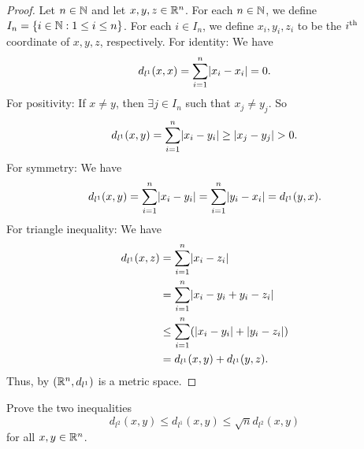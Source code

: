 \begin{proof}
  Let \(n \in \mathbb{N}\) and let \(x, y, z \in \mathbb{R}^n\).
  For each \(n \in \mathbb{N}\), we define \(I_n = \left\lbrace i \in \mathbb{N} : 1 \leq i \leq n\right\rbrace\).
  For each \(i \in I_n\), we define \(x_i, y_i, z_i\) to be the \(i^{\operatorname{th}}\) coordinate of \(x, y, z\), respectively.
  For identity:
  We have
  \[
    d_{l^1}(x, x) = \sum_{i = 1}^n \abs{x_i - x_i} = 0.
  \]
  For positivity:
  If \(x \neq y\), then \(\exists j \in I_n\) such that \(x_j \neq y_j\).
  So
  \[
    d_{l^1}(x, y) = \sum_{i = 1}^n \abs{x_i - y_i} \geq \abs{x_j - y_j} > 0.
  \]
  For symmetry:
  We have
  \[
    d_{l^1}(x, y) = \sum_{i = 1}^n \abs{x_i - y_i} = \sum_{i = 1}^n \abs{y_i - x_i} = d_{l^1}(y, x).
  \]
  For triangle inequality:
  We have
  \begin{align*}
    d_{l^1}(x, z) & = \sum_{i = 1}^n \abs{x_i - z_i}                        \\
                  & = \sum_{i = 1}^n \abs{x_i - y_i + y_i - z_i}            \\
                  & \leq \sum_{i = 1}^n (\abs{x_i - y_i} + \abs{y_i - z_i}) \\
                  & = d_{l^1}(x, y) + d_{l^1}(y, z).
  \end{align*}
  Thus, by  \((\mathbb{R}^n, d_{l^1})\) is a metric space.
\end{proof}

\begin{ex}\label{ii:ex:1.1.8}
  Prove the two inequalities
  \[
    d_{l^2}(x, y) \leq d_{l^1}(x, y) \leq \sqrt{n} d_{l^2}(x, y)
  \]
  for all \(x, y \in \mathbb{R}^n\).
\end{ex}

